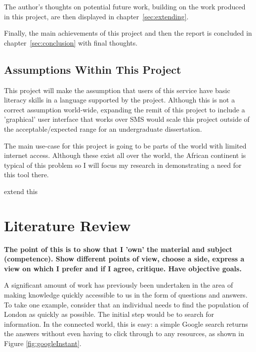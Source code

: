 \documentclass{article}
\begin{document}
The author's thoughts on potential future work, building on the work produced in this project, are then displayed in chapter~\ref{sec:extending}.  

Finally, the main achievements of this project and then the report is concluded in chapter~\ref{sec:conclusion} with final thoughts.


\subsection{Assumptions Within This Project}
This project will make the assumption that users of this service have basic literacy skills in a language supported by the project.  Although this is not a correct assumption world-wide, expanding the remit of this project to include a 'graphical' user interface that works over SMS would scale this project outside of the acceptable/expected range for an undergraduate dissertation.

The main use-case for this project is going to be parts of the world with limited internet access.  Although these exist all over the world, the African continent is typical of this problem so I will focus my research in demonstrating a need for this tool there.

{\color{red} extend this}

\newpage

\section{Literature Review}
\label{sec:literatureReview}

{\bf The point of this is to show that I 'own' the material and subject (competence).  Show different points of view, choose a side, express a view on which I prefer and if I agree, critique.  Have objective goals.}

A significant amount of work has previously been undertaken in the area of making knowledge quickly accessible to us in the form of questions and answers.  To take one example, consider that an individual needs to find the population of London as quickly as possible.  The initial step would be to search for information.  In the connected world, this is easy: a simple Google search returns the answers without even having to click through to any resources, as shown in Figure \ref{fig:googleInstant}.
\end{document}
